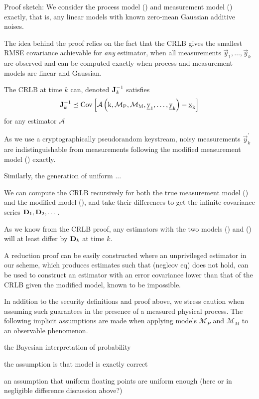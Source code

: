 \documentclass[conference]{IEEEtran}
\theoremstyle{definition}
\theoremstyle{definition}
\theoremstyle{remark}
\begin{document}
Proof sketch:
We consider the process model () and measurement model () exactly, that is, any linear models with known zero-mean Gaussian additive noises.

The idea behind the proof relies on the fact that the CRLB gives the smallest RMSE covariance achievable for \textit{any} estimator, when all measurements $\vec{y}_1,\dots,\vec{y}_k$ are observed and can be computed exactly when process and measurement models are linear and Gaussian.

The CRLB at time $k$ can, denoted ${{\mathbf{J}}}^{-1}_k$ satisfies
\begin{equation}
   \mat{J}^{-1}_k \preceq \operatorfont{Cov}\left[\mathcal{A}\left(k, \mathcal{M}_P, \mathcal{M}_M, \vec{y}_1,\dots,\vec{y}_k\right) - \vec{x}_k \right]
\end{equation}
for any estimator $\mathcal{A}$

As we use a cryptographically pseudorandom keystream, noisy measurements $\vec{y}^\prime_k$ are indistinguishable from measurements following the modified measurement model () exactly.

Similarly, the generation of uniform ...

We can compute the CRLB recursively for both the true measurement model () and the modified model (), and take their differences to get the infinite covariance series ${{\mathbf{D}}}_1,{{\mathbf{D}}}_2,\dots$. 


As we know from the CRLB proof, any estimators with the two models () and () will at least differ by ${{\mathbf{D}}}_k$ at time $k$.

A reduction proof can be easily constructed where an unprivileged estimator in our scheme, which produces estimates such that (neglcov eq) does not hold, can be used to construct an estimator with an error covariance lower than that of the CRLB given the modified model, known to be impossible.

In addition to the security definitions and proof above, we stress caution when assuming such guarantees in the presence of a measured physical process. The following implicit assumptions are made when applying models $\mathcal{M}_P$ and $\mathcal{M}_M$ to an observable phenomenon.

the Bayesian interpretation of probability

the assumption is that model is exactly correct

an assumption that uniform floating points are uniform enough (here or in negligible difference discussion above?)
\end{document}
